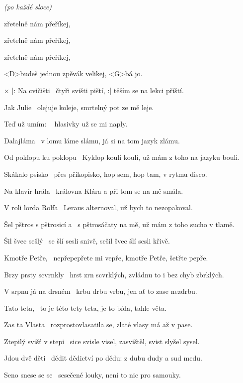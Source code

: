 
\let\mm=\ 


\zr
{\sl (po každé sloce)}

 zřetelně nám přeříkej,

 zřetelně nám přeříkej,

 zřetelně nám přeříkej,

<D>budeš jednou zpěvák velikej, <G>bá jo.
\kr

× |: Na cvičišti \mm čtyři svišti piští, :| těším se na lekci příští.
\ks

\zs
Jak Julie \mm olejuje koleje, smrtelný pot ze mě leje.
\ks

\zs
Teď už umím: \mm {} hlasivky už se mi naply.
\ks

\zs
Dalajláma \mm v lomu láme slámu, já si na tom jazyk zlámu.
\ks

\zs
Od poklopu ku poklopu \mm Kyklop kouli koulí, už mám z toho na jazyku bouli.
\ks

\zs
Skákalo psisko \mm přes příkopisko, hop sem, hop tam, v rytmu disco.
\ks

\zs
Na klavír hrála \mm královna Klára a při tom se na mě smála.
\ks

\zs
V roli lorda Rolfa \mm Leraus alternoval, už bych to nezopakoval.
\ks

\zs
Šel pštros s pštrosicí a \mm s pštrosáčaty na mě, už mám z toho sucho v tlamě.
\ks

\zs
Šil švec sešlý \mm se šlí sesli snivě, sešil švec šlí sesli křivě.
\ks

\zs
Kmotře Petře, \mm nepřepepřete mi vepře, kmotře Petře, šetřte pepře.
\ks

\zs
Brzy prsty scvrnkly \mm hrst zrn scvrklých, zvládnu to i bez chyb zbrklých.
\ks

\zs
V srpnu já na drsném \mm krbu drbu vrbu, jen ať to zase nezdrbu.
\ks

\zs
Tato teta, \mm to je této tety teta, je to bída, tahle věta.
\ks

\zs
Zas ta Vlasta \mm rozprostovlasatila se, zlaté vlasy má až v pase.
\ks

\zs
Ztepilý svišť v stepi \mm sice svisle visel, zasvištěl, svist slyšel sysel.
\ks

\zs
Jdou dvě děti \mm dědit dědictví po dědu: z dubu dudy a sud medu.
\ks

\zs
Seno snese se se \mm sesečené louky, není to nic pro samouky.
\ks

\kp
